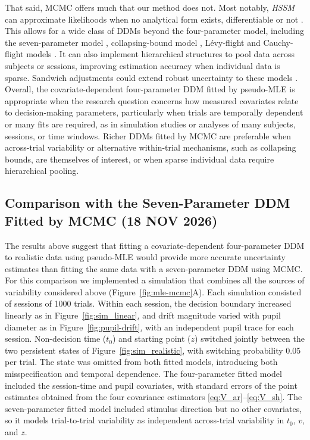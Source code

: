 \documentclass[00-main.tex]{subfiles}
\begin{document}
That said, MCMC offers much that our method does not. Most notably, \emph{HSSM} can approximate likelihoods when no analytical form exists, differentiable or not \citep{fengler_hssm_2026, fengler_beyond_2022, fengler_likelihood_2021}. This allows for a wide class of DDMs beyond the four-parameter model, including the seven-parameter model \citep{ratcliff_modeling_1998, ratcliff_estimating_2002}, collapsing-bound model \citep{drugowitsch_cost_2012}, L\'{e}vy-flight and Cauchy-flight models \citep{voss_sequential_2019}. It can also implement hierarchical structures to pool data across subjects or sessions, improving estimation accuracy when individual data is sparse. Sandwich adjustments could extend robust uncertainty to these models \citep{shaby_open-faced_2014}. Overall, the covariate-dependent four-parameter DDM fitted by pseudo-MLE is appropriate when the research question concerns how measured covariates relate to decision-making parameters, particularly when trials are temporally dependent or many fits are required, as in simulation studies or analyses of many subjects, sessions, or time windows. Richer DDMs fitted by MCMC are preferable when across-trial variability or alternative within-trial mechanisms, such as collapsing bounds, are themselves of interest, or when sparse individual data require hierarchical pooling.

\newpage

\subsection*{Comparison with the Seven-Parameter DDM Fitted by MCMC (18 NOV 2026)}
The results above suggest that fitting a covariate-dependent four-parameter DDM to realistic data using pseudo-MLE would provide more accurate uncertainty estimates than fitting the same data with a seven-parameter DDM using MCMC.  For this comparison we implemented a simulation that combines all the sources of variability considered above (Figure~\ref{fig:mle-mcmc}A). Each simulation consisted of sessions of 1000 trials. Within each session, the decision boundary increased linearly as in Figure~\ref{fig:sim_linear}, and drift magnitude varied with pupil diameter as in Figure~\ref{fig:pupil-drift}, with an independent pupil trace for each session. Non-decision time ($t_0$) and starting point ($z$) switched jointly between the two persistent states of Figure~\ref{fig:sim_realistic}, with switching probability 0.05 per trial. The state was omitted from both fitted models, introducing both misspecification and temporal dependence. The four-parameter fitted model included the session-time and pupil covariates, with standard errors of the point estimates obtained from the four covariance estimators \eqref{eq:V_ar}--\eqref{eq:V_sh}.  The seven-parameter fitted model included stimulus direction but no other covariates, so it models trial-to-trial variability as independent across-trial variability in $t_0$, $v$, and $z$.
\end{document}

